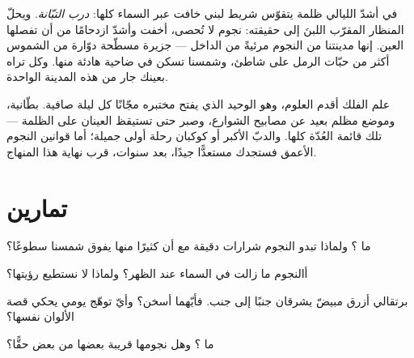 \begin{example}\label{ex:g5:stars-night-sky:milkyway}
في أشدّ الليالي ظلمة يتقوّس شريط لبني خافت عبر السماء كلها:
\emph{درب التبّانة}. ويحلّ المنظار المقرّب
اللبنَ إلى حقيقته: نجوم لا تُحصى، أخفت وأشدّ ازدحامًا من أن
تفصلها العين. إنها مدينتنا من النجوم مرئيةً من الداخل ---
جزيرة مسطّحة دوّارة من الشموس أكثر من حبّات الرمل على شاطئ،
وشمسنا تسكن في ضاحية هادئة منها. وكل  تراه بعينك جار من هذه
المدينة الواحدة.
\end{example}

\begin{remark}\label{rem:g5:stars-night-sky:lookup}
علم الفلك أقدم العلوم، وهو الوحيد الذي يفتح مختبره مجّانًا كل
ليلة صافية. بطّانية، وموضع مظلم بعيد عن مصابيح الشوارع، وصبر
حتى تستيقظ العينان على الظلمة --- تلك قائمة العُدّة كلها. والدبّ
الأكبر   أو كوكبان  رحلة أولى
جميلة؛ أما قوانين  النجوم الأعمق فستجدك مستعدًّا جيدًا، بعد
سنوات، قرب نهاية هذا المنهاج.
\end{remark}

\section{تمارين}

\begin{exercise}[$\star$]\label{exo:g5:stars-night-sky:1}
ما ؟ ولماذا تبدو النجوم شرارات دقيقة مع أن كثيرًا منها
يفوق شمسنا سطوعًا؟
\end{exercise}

\begin{exercise}[$\star$]\label{exo:g5:stars-night-sky:2}
أالنجوم ما زالت في السماء عند الظهر؟ ولماذا لا نستطيع رؤيتها؟
\end{exercise}

\begin{exercise}[$\star$]\label{exo:g5:stars-night-sky:3}
 برتقالي  أزرق مبيضّ يشرقان جنبًا إلى جنب. فأيّهما أسخن؟
وأيّ توهّج يومي يحكي قصة الألوان نفسها؟
\end{exercise}

\begin{exercise}[$\star$]\label{exo:g5:stars-night-sky:4}
ما ؟ وهل نجومها قريبة بعضها من بعض حقًّا؟
\end{exercise}

